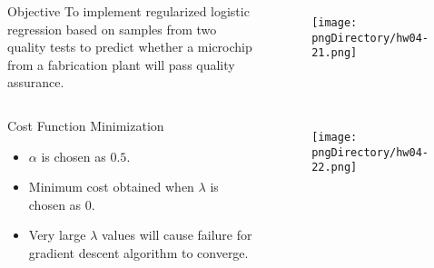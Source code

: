 \documentclass[aspectratio=169]{beamer}
\begin{document}
\begin{slide}

	\begin{columns}

	\begin{block}{Objective}
	To implement regularized logistic regression based on samples from two quality tests to predict whether a microchip from a fabrication plant will pass quality assurance.
	\end{block}

	\begin{figure}
	\texttt{[image: \\pngDirectory/hw04-21.png]}
	\end{figure}

	\end{columns}

\end{slide}

\begin{slide}

	\begin{columns}

	\column{0.4\textwidth}
	\begin{block}{Cost Function Minimization}
	\begin{itemize}
	\item $\alpha$ is chosen as $0.5$.
	\item Minimum cost obtained when $\lambda$ is chosen as $0$.
	\item Very large $\lambda$ values will cause failure for gradient descent algorithm to converge.
	\end{itemize}
	\end{block}

	\column{0.6\textwidth}
	\begin{figure}
	\texttt{[image: \\pngDirectory/hw04-22.png]}
	\end{figure}

	\end{columns}

\end{slide}
\end{document}
